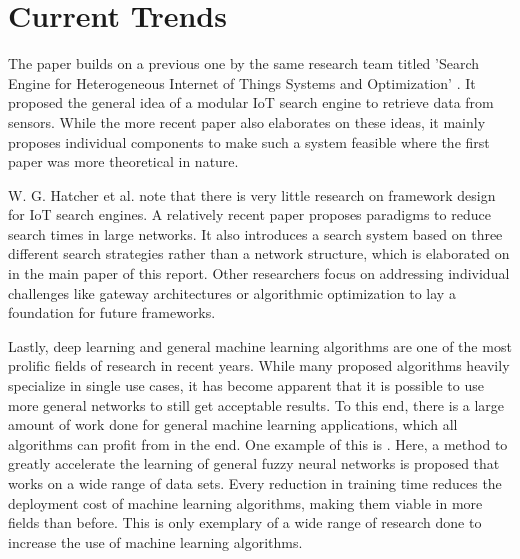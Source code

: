 \documentclass [journal]{IEEEtran}
\begin{document}
 \section{Current Trends}
The paper builds on a previous one by the same research team titled 'Search Engine for Heterogeneous Internet of Things Systems and Optimization' \cite{mainPrevious}. It proposed the general idea of a modular IoT search engine to retrieve data from sensors. While the more recent paper also elaborates on these ideas, it mainly proposes individual components to make such a system feasible where the first paper was more theoretical in nature. \par
W. G. Hatcher et al. note that there is very little research on framework design for IoT search engines. A relatively recent paper \cite{paradigm} proposes paradigms to reduce search times in large networks. It also introduces a search system based on three different search strategies rather than a network structure, which is elaborated on in the main paper of this report. Other researchers focus on addressing individual challenges like gateway architectures or algorithmic optimization to lay a foundation for future frameworks. \par
Lastly, deep learning and general machine learning algorithms are one of the most prolific fields of research in recent years. While many proposed algorithms heavily specialize in single use cases, it has become apparent that it is possible to use more general networks to still get acceptable results. To this end, there is a large amount of work done for general machine learning applications, which all algorithms can profit from in the end. One example of this is  \cite{fuzzy}. Here, a method to greatly accelerate the learning of general fuzzy neural networks is proposed that works on a wide range of data sets. Every reduction in training time reduces the deployment cost of machine learning algorithms, making them viable in more fields than before. This is only exemplary of a wide range of research done to increase the use of machine learning algorithms.
\end{document}
